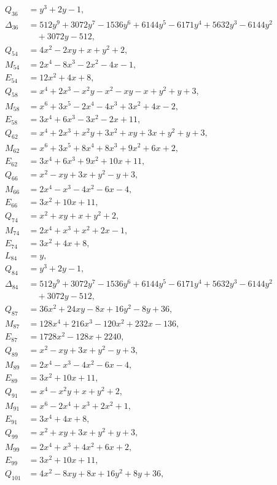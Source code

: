 \documentclass[11pt]{article}
\begin{document}
\begin{align*}
Q_{36}&=y^{3}+2y-1,\\
\Delta_{36}&=512y^{9}+3072y^{7}-1536y^{6}+6144y^{5}-6171y^{4}+5632y^{3}-6144y^{2}\\
&\quad+3072y-512,\\
Q_{54}&=4x^{2}-2xy+x+y^{2}+2,\\
M_{54}&=2x^{4}-8x^{3}-2x^{2}-4x-1,\\
E_{54}&=12x^{2}+4x+8,\\
Q_{58}&=x^{4}+2x^{3}-x^{2}y-x^{2}-xy-x+y^{2}+y+3,\\
M_{58}&=x^{6}+3x^{5}-2x^{4}-4x^{3}+3x^{2}+4x-2,\\
E_{58}&=3x^{4}+6x^{3}-3x^{2}-2x+11,\\
Q_{62}&=x^{4}+2x^{3}+x^{2}y+3x^{2}+xy+3x+y^{2}+y+3,\\
M_{62}&=x^{6}+3x^{5}+8x^{4}+8x^{3}+9x^{2}+6x+2,\\
E_{62}&=3x^{4}+6x^{3}+9x^{2}+10x+11,\\
Q_{66}&=x^{2}-xy+3x+y^{2}-y+3,\\
M_{66}&=2x^{4}-x^{3}-4x^{2}-6x-4,\\
E_{66}&=3x^{2}+10x+11,\\
Q_{74}&=x^{2}+xy+x+y^{2}+2,\\
M_{74}&=2x^{4}+x^{3}+x^{2}+2x-1,\\
E_{74}&=3x^{2}+4x+8,\\
L_{84}&=y,\\
Q_{84}&=y^{3}+2y-1,\\
\Delta_{84}&=512y^{9}+3072y^{7}-1536y^{6}+6144y^{5}-6171y^{4}+5632y^{3}-6144y^{2}\\
&\quad+3072y-512,\\
Q_{87}&=36x^{2}+24xy-8x+16y^{2}-8y+36,\\
M_{87}&=128x^{4}+216x^{3}-120x^{2}+232x-136,\\
E_{87}&=1728x^{2}-128x+2240,\\
Q_{89}&=x^{2}-xy+3x+y^{2}-y+3,\\
M_{89}&=2x^{4}-x^{3}-4x^{2}-6x-4,\\
E_{89}&=3x^{2}+10x+11,\\
Q_{91}&=x^{4}-x^{2}y+x+y^{2}+2,\\
M_{91}&=x^{6}-2x^{4}+x^{3}+2x^{2}+1,\\
E_{91}&=3x^{4}+4x+8,\\
Q_{99}&=x^{2}+xy+3x+y^{2}+y+3,\\
M_{99}&=2x^{4}+x^{3}+4x^{2}+6x+2,\\
E_{99}&=3x^{2}+10x+11,\\
Q_{101}&=4x^{2}-8xy+8x+16y^{2}+8y+36,\\

\end{align*}
\end{document}
